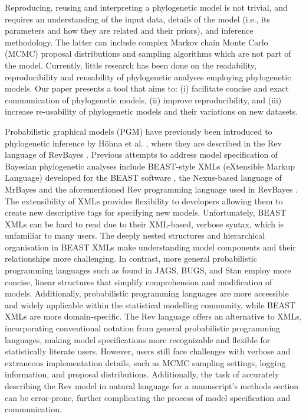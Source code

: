 \documentclass[10pt,letterpaper,table]{article}
\theoremstyle{definition}
\begin{document}
Reproducing, reusing and interpreting a phylogenetic model is not trivial, and requires an understanding of the input data, details of the model (i.e., its parameters and how they are related and their priors), and inference methodology. 
The latter can include complex Markov chain Monte Carlo (MCMC) proposal distributions and sampling algorithms which are not part of the model.
Currently, little research has been done on the readability, reproducibility and reusability of phylogenetic analyses employing phylogenetic models. 
Our paper presents a tool that aims to: (i) facilitate concise and exact communication of phylogenetic models, (ii) improve reproducibility, and (iii) increase re-usability of phylogenetic models and their variations on new datasets. 

Probabilistic graphical models (PGM) have previously been introduced to phylogenetic inference by H\"{o}hna et al. \cite{revbayes}, where they are described in the Rev language of RevBayes \cite{revbayes}. 
Previous attempts to address model specification of Bayesian phylogenetic analyses include BEAST-style XMLs (eXtensible Markup Language) developed for the BEAST software \cite{beast,beast2}, the Nexus-based language of MrBayes \cite{mrbayes} and the aforementioned Rev programming language used in RevBayes \cite{revbayes}.
The extensibility of XMLs provides flexibility to developers allowing them to create new descriptive tags for specifying new models.
Unfortunately, BEAST XMLs can be hard to read due to their XML-based, verbose syntax, which is unfamiliar to many users. The deeply nested structures and hierarchical organisation in BEAST XMLs make understanding model components and their relationships more challenging. In contrast, more general probabilistic programming languages such as found in JAGS, BUGS, and Stan employ more concise, linear structures that simplify comprehension and modification of models. Additionally, probabilistic programming languages are more accessible and widely applicable within the statistical modelling community, while BEAST XMLs are more domain-specific. 
The Rev language \cite{revbayes} offers an alternative to XMLs, incorporating conventional notation from general probabilistic programming languages, making model specifications more recognizable and flexible for statistically literate users. 
However, users still face challenges with verbose and extraneous implementation details, such as MCMC sampling settings, logging information, and proposal distributions. 
Additionally, the task of accurately describing the Rev model in natural language for a manuscript's methods section can be error-prone, further complicating the process of model specification and communication.
\end{document}
